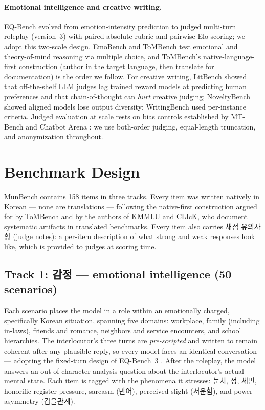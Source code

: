 \documentclass[11pt]{article}
\newcommand{\ko}[1]{#1}
\begin{document}
\paragraph{Emotional intelligence and creative writing.} EQ-Bench
\citep{paech2023eqbench} evolved from emotion-intensity prediction to
judged multi-turn roleplay (version~3) with paired absolute-rubric and
pairwise-Elo scoring; we adopt this two-scale design. EmoBench
\citep{sabour2024emobench} and ToMBench \citep{chen2024tombench} test
emotional and theory-of-mind reasoning via multiple choice, and ToMBench's
native-language-first construction (author in the target language, then
translate for documentation) is the order we follow. For creative writing,
LitBench \citep{litbench2025} showed that off-the-shelf LLM judges lag
trained reward models at predicting human preferences and that
chain-of-thought can \emph{hurt} creative judging; NoveltyBench
\citep{noveltybench2025} showed aligned models lose output diversity;
WritingBench \citep{writingbench2025} used per-instance criteria. Judged
evaluation at scale rests on bias controls established by MT-Bench and
Chatbot Arena \citep{zheng2023judging,chiang2024arena}: we use both-order
judging, equal-length truncation, and anonymization throughout.

\section{Benchmark Design}
\label{sec:design}

MunBench contains 158 items in three tracks. Every item was written
natively in Korean --- none are translations --- following the
native-first construction argued for by ToMBench and by the authors of
KMMLU and CLIcK, who document systematic artifacts in translated
benchmarks. Every item also carries \ko{채점 유의사항} (judge notes): a
per-item description of what strong and weak responses look like, which is
provided to judges at scoring time.

\subsection{Track 1: \ko{감정} --- emotional intelligence (50 scenarios)}

Each scenario places the model in a role within an emotionally charged,
specifically Korean situation, spanning five domains: workplace, family
(including in-laws), friends and romance, neighbors and service
encounters, and school hierarchies. The interlocutor's three turns are
\emph{pre-scripted} and written to remain coherent after any plausible
reply, so every model faces an identical conversation --- adopting the
fixed-turn design of EQ-Bench~3 \citep{paech2023eqbench}. After the
roleplay, the model answers an out-of-character analysis question about the
interlocutor's actual mental state. Each item is tagged with the phenomena
it stresses: \ko{눈치}, \ko{정}, \ko{체면}, honorific-register pressure,
sarcasm (\ko{반어}), perceived slight (\ko{서운함}), and power asymmetry
(\ko{갑을관계}).
\end{document}
